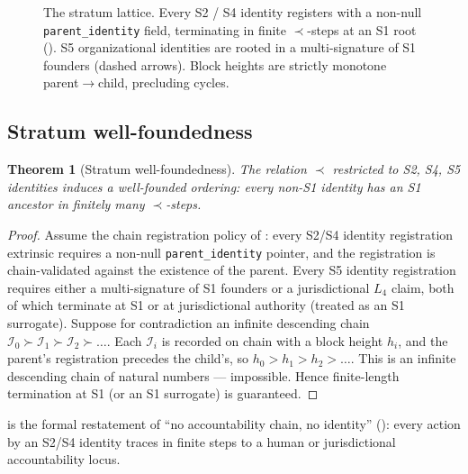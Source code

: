 \documentclass[11pt,a4paper,parskip=half-,DIV=12,headings=standardclasses]{scrartcl}
\theoremstyle{ncthm}
\newtheorem{theorem}{Theorem}[section]
\theoremstyle{ncdef}
\newcommand{\identity}{\mathcal{I}}
\begin{document}
\begin{figure}[h]
\caption{The stratum lattice. Every S2 / S4 identity registers with a
non-null \texttt{parent\_identity} field, terminating in finite
$\prec$-steps at an S1 root (). S5
organizational identities are rooted in a multi-signature of S1
founders (dashed arrows). Block heights are strictly monotone
parent$\rightarrow$child, precluding cycles.}
\label{fig:stratum-lattice}
\end{figure}

\subsection{Stratum well-foundedness}

\begin{theorem}[Stratum well-foundedness]\label{thm:stratum-wellfounded}
The relation $\prec$ restricted to S2, S4, S5 identities induces a
well-founded ordering: every non-S1 identity has an S1 ancestor in
finitely many $\prec$-steps.
\end{theorem}

\begin{proof}
Assume the chain registration policy of :
every S2/S4 identity registration extrinsic requires a non-null
\texttt{parent\_identity} pointer, and the registration is
chain-validated against the existence of the parent. Every S5
identity registration requires either a multi-signature of S1
founders or a jurisdictional $L_4$ claim, both of which terminate at
S1 or at jurisdictional authority (treated as an S1 surrogate).
Suppose for contradiction an infinite descending chain
$\identity_0 \succ \identity_1 \succ \identity_2 \succ \ldots$.
Each $\identity_i$ is recorded on chain with a block height $h_i$,
and the parent's registration precedes the child's, so
$h_0 > h_1 > h_2 > \ldots$. This is an infinite descending chain of
natural numbers --- impossible.
Hence finite-length termination at S1 (or an S1 surrogate) is
guaranteed.
\end{proof}

 is the formal restatement of
``no accountability chain, no identity''
(): every action by an S2/S4 identity traces in
finite steps to a human or jurisdictional accountability locus.
\end{document}
